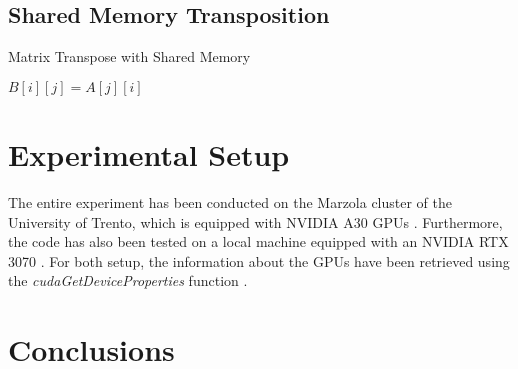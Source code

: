 \documentclass[]{IEEEconf}
\begin{document}
\subsection{Shared Memory Transposition}
\begin{algorithm}
    \caption{Matrix Transpose with Shared Memory}
    \begin{algorithmic}[1]
                    \State $B[i][j] = A[j][i]$
                \EndFor
            \EndFor
        \EndProcedure
    \end{algorithmic}
\end{algorithm}

\section{Experimental Setup}
The entire experiment has been conducted on the Marzola cluster of the University of Trento, 
which is equipped with NVIDIA A30 GPUs \cite{nvidia:a30}.
Furthermore, the code has also been tested on a local machine equipped with an NVIDIA RTX 3070 \cite{nvidia:rtx3070}.
For both setup, the information about the GPUs have been retrieved using the \textit{cudaGetDeviceProperties} function \cite{nvidia:cudaDeviceProp}.
\section{Conclusions}



\end{document}
